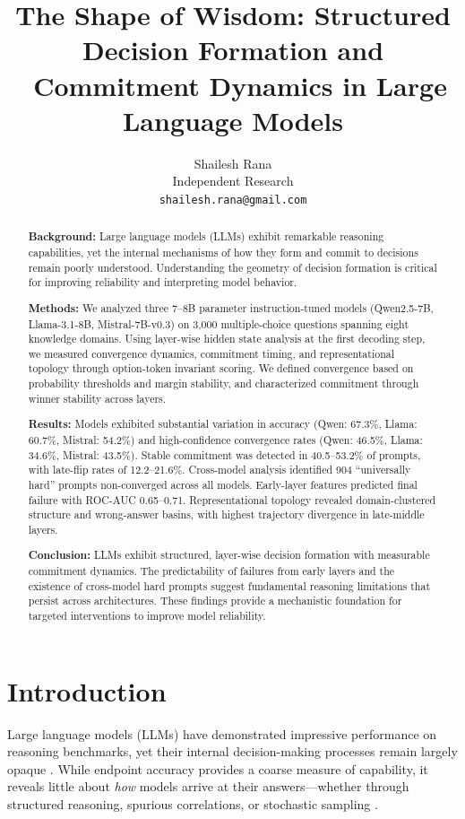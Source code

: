 \documentclass[11pt]{article}
\title{The Shape of Wisdom: Structured Decision Formation and \
Commitment Dynamics in Large Language Models}
\author{%
  Shailesh Rana\\
  Independent Research\\
  \texttt{shailesh.rana@gmail.com}\\
}
\theoremstyle{definition}
\begin{document}
\maketitle

\begin{abstract}
\textbf{Background:} Large language models (LLMs) exhibit remarkable reasoning capabilities, yet the internal mechanisms of how they form and commit to decisions remain poorly understood. Understanding the geometry of decision formation is critical for improving reliability and interpreting model behavior.

\textbf{Methods:} We analyzed three 7--8B parameter instruction-tuned models (Qwen2.5-7B, Llama-3.1-8B, Mistral-7B-v0.3) on 3,000 multiple-choice questions spanning eight knowledge domains. Using layer-wise hidden state analysis at the first decoding step, we measured convergence dynamics, commitment timing, and representational topology through option-token invariant scoring. We defined convergence based on probability thresholds and margin stability, and characterized commitment through winner stability across layers.

\textbf{Results:} Models exhibited substantial variation in accuracy (Qwen: 67.3\%, Llama: 60.7\%, Mistral: 54.2\%) and high-confidence convergence rates (Qwen: 46.5\%, Llama: 34.6\%, Mistral: 43.5\%). Stable commitment was detected in 40.5--53.2\% of prompts, with late-flip rates of 12.2--21.6\%. Cross-model analysis identified 904 ``universally hard'' prompts non-converged across all models. Early-layer features predicted final failure with ROC-AUC 0.65--0.71. Representational topology revealed domain-clustered structure and wrong-answer basins, with highest trajectory divergence in late-middle layers.

\textbf{Conclusion:} LLMs exhibit structured, layer-wise decision formation with measurable commitment dynamics. The predictability of failures from early layers and the existence of cross-model hard prompts suggest fundamental reasoning limitations that persist across architectures. These findings provide a mechanistic foundation for targeted interventions to improve model reliability.
\end{abstract}

\section{Introduction}

Large language models (LLMs) have demonstrated impressive performance on reasoning benchmarks, yet their internal decision-making processes remain largely opaque \citep{berglund2023reversal,meng2022locating}. While endpoint accuracy provides a coarse measure of capability, it reveals little about \textit{how} models arrive at their answers---whether through structured reasoning, spurious correlations, or stochastic sampling \citep{mccoy2019right,ribeiro2020beyond}.
\end{document}
